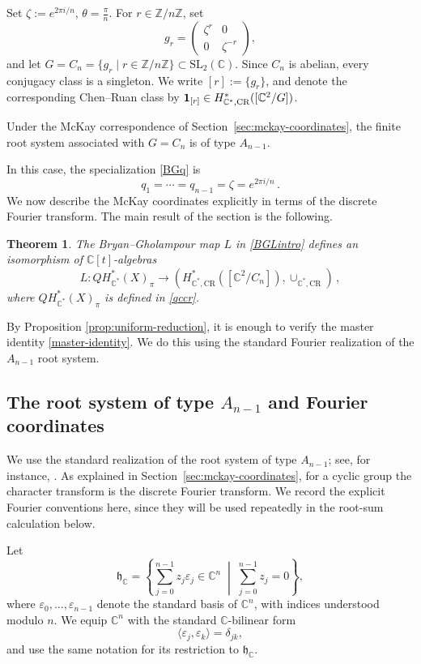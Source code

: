 \documentclass[a4paper,reqno]{amsart}
\theoremstyle{plain} %
\newtheorem{thm}{Theorem}[section]
\theoremstyle{definition} %
\theoremstyle{remark} %
\newcommand{\C}{\mathbb{C}}
\newcommand{\z}{\zeta}
\newcommand{\ve}{{\varepsilon}}
\newcommand{\1}{\mathds{1}}   %
\begin{document}
Set $\z :=e^{2\pi i/n}$, $\theta=\frac{\pi}{n}$. For $r\in\mathbb{Z}/n\mathbb{Z}$, set
\[
g_r=
\begin{pmatrix}
\z^r & 0\\
0 & \z^{-r}
\end{pmatrix},
\]
and let $G=C_n = \{g_r\mid r\in\mathbb{Z}/n\mathbb{Z}\} \subset \mathrm{SL}_2(\mathbb{C})$.
Since \(C_n\) is abelian, every conjugacy class is a singleton.
We write $[r]:=\{g_r\}$, and denote the corresponding Chen--Ruan class by 
$\mathbf{1}_{[r]} \in H^*_{\C^*, {\rm CR}}([\C^2/G])$.

Under the McKay correspondence of Section~\ref{sec:mckay-coordinates}, the finite root system associated with \(G=C_n\) is of type 
$A_{n-1}$.
 


In this case, the specialization \eqref{BGq} is
\[
q_1=\cdots=q_{n-1}=\z = e^{2\pi i/n} \, .
\]
We now describe the McKay coordinates explicitly in terms of the discrete Fourier transform.
The main result of the section is the following.

\begin{thm}\label{thm:cyclic-CCRC}
The Bryan--Gholampour map  \(L\) in \eqref{BGLintro} defines an isomorphism of
\(\mathbb{C}[t]\)-algebras
\[
L: QH_{\mathbb{C}^*}^*(X)_{\pi} \longrightarrow \left( H_{\mathbb{C}^*,\mathrm{CR}}^* \left( [\mathbb{C}^2/C_n] \right),
\cup_{\mathbb{C}^*,\mathrm{CR}}
\right) \, ,
\]
where $QH_{\mathbb{C}^*}^*(X)_{\pi}$ is defined in \eqref{qccr}.
\end{thm}
By Proposition \ref{prop:uniform-reduction}, it is enough to verify the master identity \eqref{master-identity}. 
We do this using the standard Fourier realization of the \(A_{n-1}\) root system.

\subsection{The root system of type $A_{n-1}$ and Fourier coordinates}\label{RSAF}

We use the standard realization of the root system of type $A_{n-1}$;
see, for instance, \cite{Humphreys}.  As explained in
Section~\ref{sec:mckay-coordinates}, for a cyclic group the character transform
is the discrete Fourier transform.  We record the explicit Fourier conventions
here, since they will be used repeatedly in the root-sum calculation below.

Let
\[
\mathfrak h_{\mathbb C}
=
\left\{
\sum_{j=0}^{n-1} z_j \ve_j \in \mathbb C^n
\;\middle|\;
\sum_{j=0}^{n-1}z_j=0
\right\},
\]
where $\ve_0,\ldots, \ve_{n-1}$ denote the standard basis of
$\mathbb C^n$, with indices understood modulo $n$.  We equip
$\mathbb C^n$ with the standard $\mathbb C$-bilinear form
\[
\langle \ve_j, \ve_k\rangle=\delta_{jk},
\]
and use the same notation for its restriction to
$\mathfrak h_{\mathbb C}$.
\end{document}
